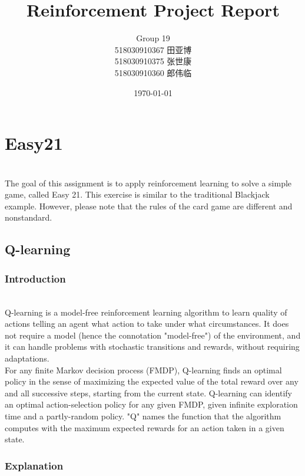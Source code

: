 \documentclass[12pt]{article}
\title{Reinforcement Project Report}
\author{Group 19 \\518030910367 田亚博 \\518030910375 张世康 \\518030910360 郎伟临}
\date{\today}
\begin{document}
\maketitle

\section{Easy21}

~\\\indent The goal of this assignment is to apply reinforcement learning to solve a simple
game, called Easy 21. This exercise is similar to the traditional Blackjack example.
However, please note that the rules of the card game are different and nonstandard.

\subsection{Q-learning}

\subsubsection{Introduction}

~\\\indent Q-learning is a model-free reinforcement learning algorithm to learn quality of actions telling an agent what action to take under what circumstances. It does not require a model (hence the connotation "model-free") of the environment, and it can handle problems with stochastic transitions and rewards, without requiring adaptations.
~\\\indent For any finite Markov decision process (FMDP), Q-learning finds an optimal policy in the sense of maximizing the expected value of the total reward over any and all successive steps, starting from the current state. Q-learning can identify an optimal action-selection policy for any given FMDP, given infinite exploration time and a partly-random policy. "Q" names the function that the algorithm computes with the maximum expected rewards for an action taken in a given state.

\subsubsection{Explanation}
\end{document}
